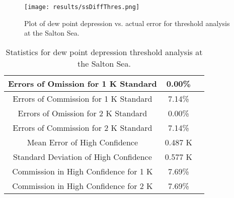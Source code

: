 \documentclass{book}
\begin{document}
\begin{minipage}[c]{0.47\textwidth}
\centering
\begin{figure}[H]
\texttt{[image: results/ssDiffThres.png]}
\caption{Plot of dew point depression vs. actual error for threshold analysis at the Salton Sea.}
\label{fig:ssDiffThres}
\end{figure}
\end{minipage}
\begin{minipage}[c]{0.47\textwidth}
\begin{table}[H]
\centering
\footnotesize
\begin{tabular}{ | c | c | c | } \hline
Errors of Omission for 1 K Standard & 0.00\% \\ \hline
Errors of Commission for 1 K Standard & 7.14\% \\ \hline
Errors of Omission for 2 K Standard & 0.00\% \\ \hline
Errors of Commission for 2 K Standard & 7.14\% \\ \hline
Mean Error of High Confidence & 0.487 K \\ \hline
Standard Deviation of High Confidence & 0.577 K \\ \hline
Commission in High Confidence for 1 K & 7.69\% \\ \hline
Commission in High Confidence for 2 K & 7.69\% \\ \hline
\end{tabular}
\caption{Statistics for dew point depression threshold analysis at the Salton Sea.}
\label{tab:ssDiffThres}
\end{table}
\end{minipage}
\end{document}
